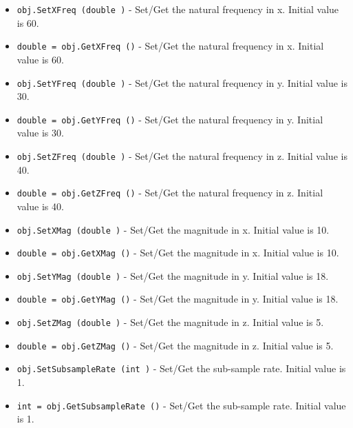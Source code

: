 \begin{itemize}
\item  \verb|obj.SetXFreq (double )| -  Set/Get the natural frequency in x. Initial value is 60.

\item  \verb|double = obj.GetXFreq ()| -  Set/Get the natural frequency in x. Initial value is 60.

\item  \verb|obj.SetYFreq (double )| -  Set/Get the natural frequency in y. Initial value is 30.

\item  \verb|double = obj.GetYFreq ()| -  Set/Get the natural frequency in y. Initial value is 30.

\item  \verb|obj.SetZFreq (double )| -  Set/Get the natural frequency in z. Initial value is 40.

\item  \verb|double = obj.GetZFreq ()| -  Set/Get the natural frequency in z. Initial value is 40.

\item  \verb|obj.SetXMag (double )| -  Set/Get the magnitude in x. Initial value is 10.

\item  \verb|double = obj.GetXMag ()| -  Set/Get the magnitude in x. Initial value is 10.

\item  \verb|obj.SetYMag (double )| -  Set/Get the magnitude in y. Initial value is 18.

\item  \verb|double = obj.GetYMag ()| -  Set/Get the magnitude in y. Initial value is 18.

\item  \verb|obj.SetZMag (double )| -  Set/Get the magnitude in z. Initial value is 5.

\item  \verb|double = obj.GetZMag ()| -  Set/Get the magnitude in z. Initial value is 5.

\item  \verb|obj.SetSubsampleRate (int )| -  Set/Get the sub-sample rate. Initial value is 1.

\item  \verb|int = obj.GetSubsampleRate ()| -  Set/Get the sub-sample rate. Initial value is 1.

\end{itemize}
